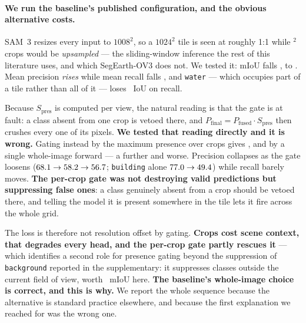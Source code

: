 \documentclass[10pt,a4paper]{article}                        %
\newcommand{\best}[1]{\textbf{#1}}
\newcommand{\bg}{\texttt{background}}
\begin{document}
\paragraph{We run the baseline's published configuration, and the obvious
alternative costs.} SAM~3 resizes every input to $1008^2$, so a $1024^2$ tile is
seen at roughly 1:1 while \swCrop{}$^2$ crops would be \emph{upsampled} --- the
sliding-window inference the rest of this literature uses, and which
SegEarth-OV3 does not. We tested it: mIoU falls \swDelta{}, to \swMIoU{}. Mean precision \emph{rises}
\swPrec{} while mean recall falls \swRec{}, and \texttt{water} --- which occupies
part of a tile rather than all of it --- loses \swWater{}~IoU on \swWaterRec{}
recall.

Because $S_\mathrm{pres}$ is computed per view, the natural reading is that the
gate is at fault: a class absent from one crop is vetoed there, and
$P_\mathrm{final}=P_\mathrm{fused}\cdot S_\mathrm{pres}$ then crushes every one of
its pixels. \best{We tested that reading directly and it is wrong.} Gating instead
by the maximum presence over crops gives \swMax{}, and by a single whole-image
forward \swGlobal{} --- a further \swMaxDelta{} and worse. Precision collapses as
the gate loosens ($68.1 \rightarrow 58.2 \rightarrow 56.7{}$; \texttt{building} alone $77.0 \rightarrow 49.4{}$) while
recall barely moves. \best{The per-crop gate was not destroying valid predictions
but suppressing false ones}: a class genuinely absent from a crop should be vetoed
there, and telling the model it is present somewhere in the tile lets it fire
across the whole grid.

The loss is therefore not resolution offset by gating. \best{Crops cost scene
context, that degrades every head, and the per-crop gate partly rescues it} ---
which identifies a second role for presence gating beyond the suppression of
\bg{} reported in the supplementary: it suppresses classes outside the current
field of view, worth \swMaxDelta{}~mIoU here. \best{The baseline's whole-image
choice is correct, and this is why.} We report the whole sequence because the
alternative is standard practice elsewhere, and because the first explanation we
reached for was the wrong one.
\end{document}
